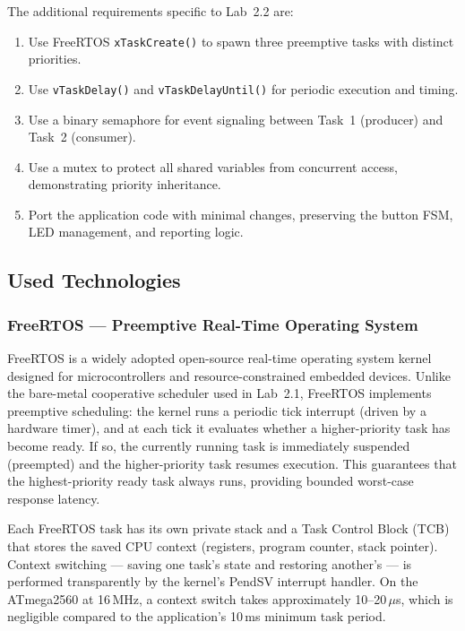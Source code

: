 The additional requirements specific to Lab~2.2 are:

\begin{enumerate}
    \item Use FreeRTOS \texttt{xTaskCreate()} to spawn three preemptive tasks with distinct priorities.
    \item Use \texttt{vTaskDelay()} and \texttt{vTaskDelayUntil()} for periodic execution and timing.
    \item Use a binary semaphore for event signaling between Task~1 (producer) and Task~2 (consumer).
    \item Use a mutex to protect all shared variables from concurrent access, demonstrating priority inheritance.
    \item Port the application code with minimal changes, preserving the button FSM, LED management, and reporting logic.
\end{enumerate}

\subsection{Used Technologies}

\subsubsection{FreeRTOS --- Preemptive Real-Time Operating System}

FreeRTOS is a widely adopted open-source real-time operating system kernel designed for microcontrollers and resource-constrained embedded devices. Unlike the bare-metal cooperative scheduler used in Lab~2.1, FreeRTOS implements preemptive scheduling: the kernel runs a periodic tick interrupt (driven by a hardware timer), and at each tick it evaluates whether a higher-priority task has become ready. If so, the currently running task is immediately suspended (preempted) and the higher-priority task resumes execution. This guarantees that the highest-priority ready task always runs, providing bounded worst-case response latency.

Each FreeRTOS task has its own private stack and a Task Control Block (TCB) that stores the saved CPU context (registers, program counter, stack pointer). Context switching --- saving one task's state and restoring another's --- is performed transparently by the kernel's PendSV interrupt handler. On the ATmega2560 at 16\,MHz, a context switch takes approximately 10--20\,$\mu$s, which is negligible compared to the application's 10\,ms minimum task period.

